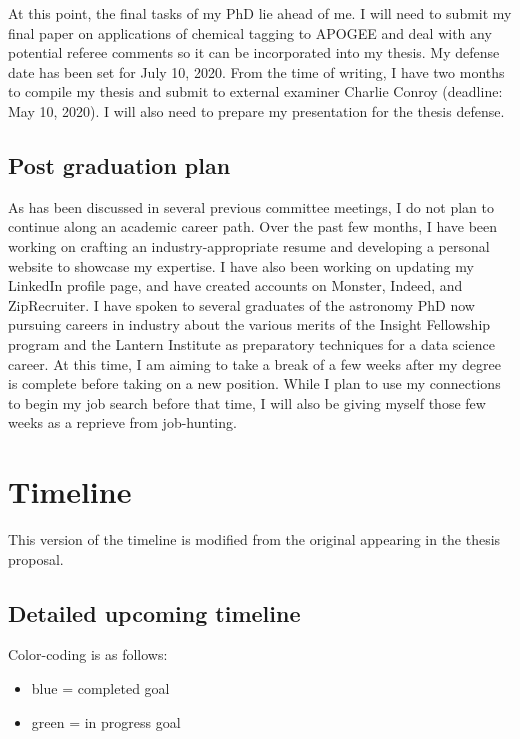 \documentclass[11pt]{article}
\begin{document}
    At this point, the final tasks of my PhD lie ahead of me.  I will need to submit my final paper on applications of chemical tagging to APOGEE and deal with any potential referee comments so it can be incorporated into my thesis. My defense date has been set for July 10, 2020. From the time of writing, I have two months to compile my thesis and submit to external examiner Charlie Conroy (deadline: May 10, 2020). I will also need to prepare my presentation for the thesis defense.
    
	\subsection*{Post graduation plan}
	
	As has been discussed in several previous committee meetings, I do not plan to continue along an academic career path. Over the past few months, I have been working on crafting an industry-appropriate resume and developing a personal website to showcase my expertise. I have also been working on updating my LinkedIn profile page, and have created accounts on Monster, Indeed, and ZipRecruiter. I have spoken to several graduates of the astronomy PhD now pursuing careers in industry about the various merits of the Insight Fellowship program and the Lantern Institute as preparatory techniques for a data science career. At this time, I am aiming to take a break of a few weeks after my degree is complete before taking on a new position. While I plan to use my connections to begin my job search before that time, I will also be giving myself those few weeks as a reprieve from job-hunting.

\section*{Timeline}

This version of the timeline is modified from the original appearing in the thesis proposal. 

\subsection*{Detailed upcoming timeline}
Color-coding is as follows:
    
    \begin{itemize}
    	\item {\color{RoyalBlue}blue} = completed goal
    	\item {\color{ForestGreen} green} = in progress goal
    \end{itemize}
\end{document}
